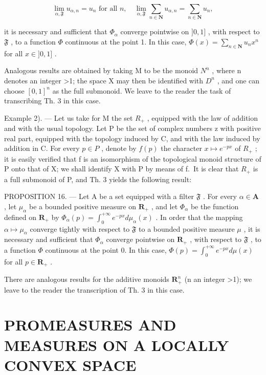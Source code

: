 \[
\lim _ {\alpha , \mathfrak {F}} u _ {\alpha , n} = u _ {n} \text {   for   all   } n, \quad \lim _ {\alpha , \mathfrak {F}} \sum_ {n \in \mathbf {N}} u _ {\alpha , n} = \sum_ {n \in \mathbf {N}} u _ {n},
\]

it is necessary and sufficient that \(\Phi_{\alpha}\) converge pointwise on \(]0,1]\) , with respect to \(\mathfrak{F}\) , to a function \(\Phi\) continuous at the point 1. In this case, \(\Phi(x) = \sum_{n \in \mathbf{N}} u_n x^n\) for all \(x \in ]0,1]\) .

Analogous results are obtained by taking M to be the monoid \(N^{n}\) , where n denotes an integer \textgreater1; the space X may then be identified with \(D^{n}\) , and one can choose \([0,1]^{n}\) as the full submonoid. We leave to the reader the task of transcribing Th. 3 in this case.

Example 2). --- Let us take for M the set \(R_{+}\) , equipped with the law of addition and with the usual topology. Let P be the set of complex numbers z with positive real part, equipped with the topology induced by C, and with the law induced by addition in C. For every \(p \in P\) , denote by \(f(p)\) the character \(x \mapsto e^{-px}\) of \(R_{+}\) ; it is easily verified that f is an isomorphism of the topological monoid structure of P onto that of X; we shall identify X with P by means of f.~It is clear that \(R_{+}\) is a full submonoid of P, and Th. 3 yields the following result:

PROPOSITION 16. --- Let A be a set equipped with a filter \(\mathfrak{F}\) . For every \(\alpha \in \mathbf{A}\) , let \(\mu_{\alpha}\) be a bounded positive measure on \(\mathbf{R}_{+}\) , and let \(\Phi_{\alpha}\) be the function defined on \(\mathbf{R}_{+}\) by \(\Phi_{\alpha}(p) = \int_{0}^{+\infty} e^{-px} d\mu_{\alpha}(x)\) . In order that the mapping \(\alpha \mapsto \mu_{\alpha}\) converge tightly with respect to \(\mathfrak{F}\) to a bounded positive measure \(\mu\) , it is necessary and sufficient that \(\Phi_{\alpha}\) converge pointwise on \(\mathbf{R}_{+}\) , with respect to \(\mathfrak{F}\) , to a function \(\Phi\) continuous at the point 0. In this case, \(\Phi(p) = \int_{0}^{+\infty} e^{-px} d\mu(x)\) for all \(p \in \mathbf{R}_{+}\) .

There are analogous results for the additive monoids \(\mathbf{R}_{+}^{n}\) (n an integer \textgreater1); we leave to the reader the transcription of Th. 3 in this case.

\section{PROMEASURES AND MEASURES ON A LOCALLY CONVEX SPACE}

